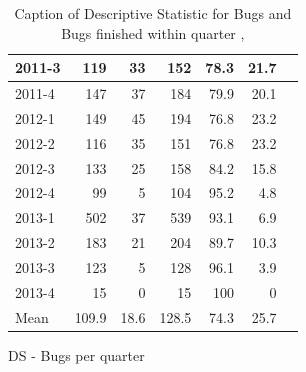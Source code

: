 \documentclass[UKenglish]{ifimaster}  %
\begin{document}
\begin{appendices}
\begin{table}[!htbp]
\begin{adjustwidth}{-2.5cm}{}
\begin{subfigure}[b]{0.4\textwidth}
{\begin{tabular}{ | l | r | r | r | r | r | r | }
2011-3 & 119 & 33 & 152 & 78.3 & 21.7 \\ \hline
2011-4 & 147 & 37 & 184 & 79.9 & 20.1 \\ \hline
2012-1 & 149 & 45 & 194 & 76.8 & 23.2 \\ \hline
2012-2 & 116 & 35 & 151 & 76.8 & 23.2 \\ \hline
2012-3 & 133 & 25 & 158 & 84.2 & 15.8 \\ \hline
2012-4 & 99 & 5 & 104 & 95.2 & 4.8 \\ \hline
2013-1 & 502 & 37 & 539 & 93.1 & 6.9 \\ \hline
2013-2 & 183 & 21 & 204 & 89.7 & 10.3 \\ \hline
2013-3 & 123 & 5 & 128 & 96.1 & 3.9 \\ \hline
2013-4 & 15 & 0 & 15 & 100 & 0 \\ \hline
Mean & 109.9&	18.6&128.5&74.3&25.7 \\ \hline

\end{tabular}
}
\caption{DS - Bugs per quarter}
 \label{DS:FTPQ:5}
\end{subfigure}
\end{adjustwidth}
\caption[Optional caption for list of figures]{Caption of Descriptive Statistic for Bugs and Bugs finished within quarter  , }
\label{DS:2:5} %
\end{table}



\end{appendices}
\end{document}
